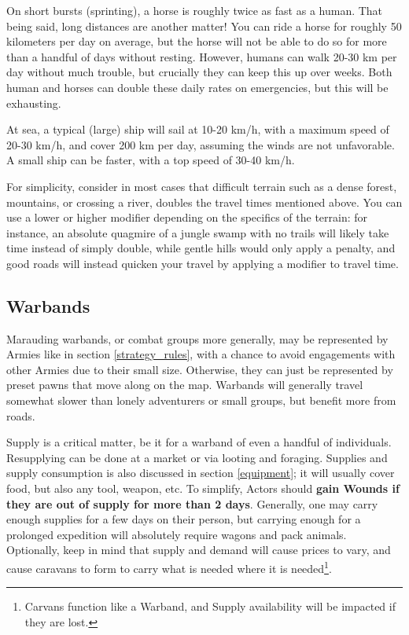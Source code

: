 On short bursts (sprinting), a horse is roughly twice as fast as a human. That being said, long distances are another matter! You can ride a horse for roughly 50 kilometers per day on average, but the horse will not be able to do so for more than a handful of days without resting. However, humans can walk 20-30 km per day without much trouble, but crucially they can keep this up over weeks. Both human and horses can double these daily rates on emergencies, but this will be exhausting.

At sea, a typical (large) ship will sail at 10-20 km/h, with a maximum speed of 20-30 km/h, and cover 200 km per day, assuming the winds are not unfavorable. A small ship can be faster, with a top speed of 30-40 km/h.

For simplicity, consider in most cases that difficult terrain such as a dense forest, mountains, or crossing a river, doubles the travel times mentioned above. You can use a lower or higher modifier depending on the specifics of the terrain: for instance, an absolute quagmire of a jungle swamp with no trails will likely take  time instead of simply double, while gentle hills would only apply a  penalty, and good roads will instead quicken your travel by applying a  modifier to travel time.

\subsection{Warbands}

Marauding warbands, or combat groups more generally, may be represented by Armies like in section \ref{strategy_rules}, with a chance to avoid engagements with other Armies due to their small size. Otherwise, they can just be represented by preset pawns that move along on the map. Warbands will generally travel somewhat slower than lonely adventurers or small groups, but benefit more from roads.

Supply is a critical matter, be it for a warband of even a handful of individuals. Resupplying can be done at a market or via looting and foraging. Supplies and supply consumption is also discussed in section \ref{equipment}; it will usually cover food, but also any tool, weapon, etc. To simplify, Actors should \textbf{gain Wounds if they are out of supply for more than 2 days}. Generally, one may carry enough supplies for a few days on their person, but carrying enough for a prolonged expedition will absolutely require wagons and pack animals. Optionally, keep in mind that supply and demand will cause prices to vary, and cause caravans to form to carry what is needed where it is needed\footnote{Carvans function like a Warband, and Supply availability will be impacted if they are lost.}.
	

